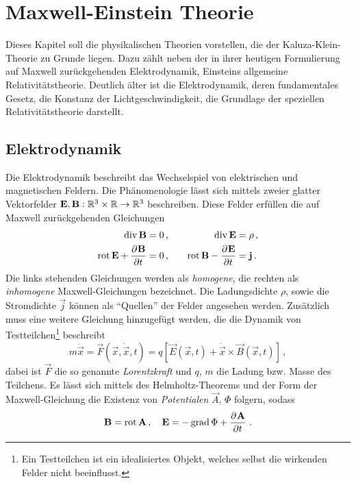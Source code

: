 \chapter{Maxwell-Einstein Theorie \label{chap:EMW}}
Dieses Kapitel soll die physikalischen Theorien vorstellen, die der
Kaluza-Klein-Theorie zu Grunde liegen. Dazu zählt neben der
in ihrer heutigen Formulierung auf Maxwell zurückgehenden
Elektrodynamik, Einsteins allgemeine Relativitätstheorie.
Deutlich älter ist die Elektrodynamik, deren fundamentales Gesetz, die Konstanz
der Lichtgeschwindigkeit, die Grundlage der speziellen Relativitätstheorie
darstellt.
\section{Elektrodynamik}
Die Elektrodynamik beschreibt das Wechselspiel von elektrischen und
magnetischen Feldern. Die Phänomenologie lässt sich mittels zweier glatter Vektorfelder
${\mathbf{E},\mathbf{B}:\mathbb{R}^3\times\mathbb{R}\to \mathbb{R}^3}$ beschreiben.
Diese Felder erfüllen die auf Maxwell zurückgehenden Gleichungen
\begin{equation}
\begin{alignedat}{2}
\Div\vec{B} &= 0    \,,  & \qquad \Div\vec{E} &= \rho
\,,\\
\Rot\vec{E}+\dpd{\vec{B}}{t}&=0\,,& \qquad\Rot\vec{B}-\dpd{\vec{E}}{t}&
=\vec{j}\,.
\end{alignedat}
\end{equation}
Die links stehenden Gleichungen werden als \emph{homogene}, die rechten als
\emph{inhomogene} Maxwell-Gleichungen bezeichnet. Die Ladungsdichte $\rho$,
sowie die Stromdichte $\vec{j}$ können als "`Quellen"' der Felder angesehen
werden. Zusätzlich muss eine weitere Gleichung hinzugefügt werden, die die
Dynamik von Testteilchen\footnote{Ein Testteilchen ist ein idealisiertes Objekt, welches selbst die wirkenden Felder nicht beeinflusst.} beschreibt
\begin{equation}
m\ddot{\vec{x}}=\vec{F}(\vec{x},\dot{\vec{x}},t)
=q\left[\vec{E}(\vec{x},t)+\dot{\vec{x}}\times\vec{B}(\vec{x},t)\right]\,,
\end{equation}
dabei ist $\vec{F}$ die so genannte \emph{Lorentzkraft} und $q$, $m$ die
Ladung bzw. Masse des Teilchens.
Es lässt sich mittels des Helmholtz-Theorems und der Form der Maxwell-Gleichung
die Existenz von \emph{Potentialen} $\vec{A}$, $\Phi$ folgern, sodass
\begin{equation}
\vec{B}=\Rot \vec{A}\,,\quad
\vec{E}=-\Grad\Phi+\dpd{\vec{A}}{t}\,.\label{eq:Vecpot}
\end{equation}
